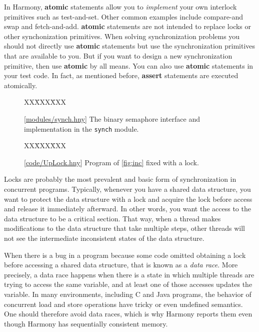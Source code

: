 \documentclass{report}
\newcommand{\harmonysource}[1]{
\begin{tabbing}
XX\=XXX\=XXX\kill
    
\end{tabbing}
}
\newcommand{\harmonylink}[1]{%
[\href{https://harmony.cs.cornell.edu/#1}{\underline{#1}}]%
}
\newenvironment{code}{
\tcolorbox
}{
\endtcolorbox
}
\begin{document}
In Harmony, \textbf{atomic} statements allow you to \emph{implement} your own
interlock primitives such as test-and-set.  Other common examples
include compare-and swap and fetch-and-add.  \textbf{atomic} statements
are not intended to replace locks or other synchonization primitives.
When solving synchronization problems you should not directly use
\textbf{atomic} statements but use the synchronization primitives that are available
to you.  But if you want to design a new synchronization primitive, then
use \textbf{atomic} by all means.
You can also use \textbf{atomic} statements in your test code.
In fact, as mentioned before, \textbf{assert} statements are executed atomically.

\begin{figure}
\begin{code}
\harmonysource{lockintf}
\end{code}
\caption{\harmonylink{modules/synch.hny} The binary semaphore interface and implementation in the \texttt{synch} module.}
\label{fig:spinlocks}
\end{figure}

\begin{figure}
\begin{code}
\harmonysource{UpLock}
\end{code}
\caption{\harmonylink{code/UpLock.hny} Program of \autoref{fig:inc} fixed with a lock.}
\label{fig:incfixed}
\end{figure}

Locks are probably the most prevalent and basic form of synchronization
in concurrent programs.  Typically, whenever you have a shared data
structure, you want to protect the data structure with a lock and
acquire the lock before access and release it immediately afterward.
In other words, you want the access to the data structure to be a
critical section.
That way, when a thread makes modifications to the data structure that take
multiple steps, other threads will not see the intermediate inconsistent
states of the data structure.

%
%
When there is a bug in a program because some code omitted obtaining
a lock before accessing a shared data structure, that is known as a
\emph{data race}.
More precisely, a data race happens when there is a state in which multiple
threads are trying to access the same variable, and at least one of those
accesses updates the variable.
In many environments, including C and Java programs, the behavior of
concurrent load and store operations have tricky or even undefined
semantics.  One should therefore avoid data races, which is why Harmony
reports them even though Harmony has sequentially consistent memory.
\end{document}
